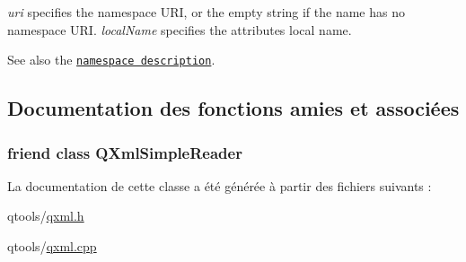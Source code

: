{\itshape uri} specifies the namespace U\+R\+I, or the empty string if the name has no namespace U\+R\+I. {\itshape local\+Name} specifies the attribute\textquotesingle{}s local name.

See also the \href{xml-sax.html#namespaces}{\tt namespace description}. 

\subsection{Documentation des fonctions amies et associées}
\hypertarget{class_q_xml_attributes_aba6d8e1fe7917a5056b07bf8d4b4e53c}{}
\subsubsection[{Q\+Xml\+Simple\+Reader}]{\setlength{\rightskip}{0pt plus 5cm}friend class {\bf Q\+Xml\+Simple\+Reader}\hspace{0.3cm}{\ttfamily [friend]}}\label{class_q_xml_attributes_aba6d8e1fe7917a5056b07bf8d4b4e53c}


La documentation de cette classe a été générée à partir des fichiers suivants \+:\begin{DoxyCompactItemize}
\item 
qtools/\hyperlink{qxml_8h}{qxml.\+h}\item 
qtools/\hyperlink{qxml_8cpp}{qxml.\+cpp}\end{DoxyCompactItemize}
